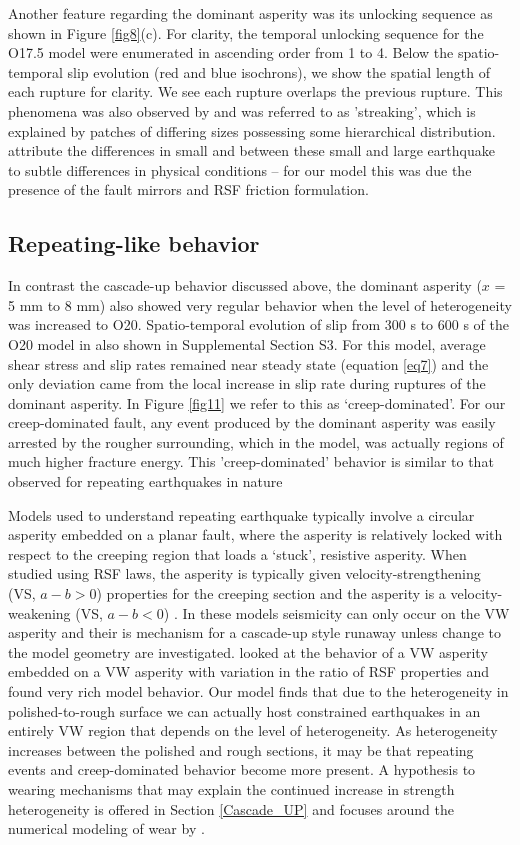 \documentclass[preprint,1p, 10pt,authoryear]{elsarticle}
\begin{document}
Another feature regarding the dominant asperity was its unlocking sequence as shown in Figure \ref{fig8}(c). For clarity, the temporal unlocking sequence for the O17.5 model were enumerated in ascending order from 1 to 4.  Below the spatio-temporal slip evolution (red and blue isochrons), we show the spatial length of each rupture for clarity. We see each rupture overlaps the previous rupture. This phenomena was also observed by \citet{Okuda2018a} and was referred to as 'streaking', which is explained by patches of differing sizes possessing some hierarchical distribution. \citet{Okuda2018a} attribute the differences in small and between these small and large earthquake to subtle differences in physical conditions -- for our model this was due the presence of the fault mirrors and RSF friction formulation.

\subsection{Repeating-like behavior}
In contrast the cascade-up behavior discussed above, the dominant asperity ($x$ = 5 mm to 8 mm) also showed very regular behavior when the level of heterogeneity was increased to O20.  Spatio-temporal evolution of slip from 300 s to 600 s of the O20 model in also shown in Supplemental Section S3. For this model, average shear stress and slip rates remained near steady state (equation \eqref{eq7}) and the only deviation came from the local increase in slip rate during ruptures of the dominant asperity.  In Figure \ref{fig11} we refer to this as `creep-dominated'. For our creep-dominated fault, any event produced by the dominant asperity was easily arrested by the rougher surrounding, which in the model, was actually regions of much higher fracture energy.  This 'creep-dominated' behavior is similar to that observed for repeating earthquakes in nature \citep[e.g., ][]{Beeler2001,Uchide2019}

Models used to understand repeating earthquake typically involve a circular asperity embedded on a planar fault, where the asperity is relatively locked with respect to the creeping region that loads a `stuck', resistive asperity. When studied using RSF laws, the asperity is typically given velocity-strengthening (VS, $a-b>0$) properties for the creeping section and the asperity is a velocity-weakening  (VS, $a-b<0$) \citep{Kato2003,Chen2009}.  In these models seismicity can only occur on the VW asperity and their is mechanism for a cascade-up style runaway unless change to the model geometry are investigated.  \citet{Noda2013} looked at the behavior of a VW asperity embedded on a VW asperity with variation in the ratio of RSF properties and found very rich model behavior. Our model finds that due to the heterogeneity in polished-to-rough surface we can actually host constrained earthquakes in an entirely VW region that depends on the level of heterogeneity.  As heterogeneity increases between the polished and rough sections, it may be that repeating events and creep-dominated behavior become more present.  A hypothesis to wearing mechanisms that may explain the continued increase in strength heterogeneity is offered in Section \ref{Cascade_UP} and focuses around the numerical modeling of wear by \citet{Aghababaei2016}.
\end{document}
